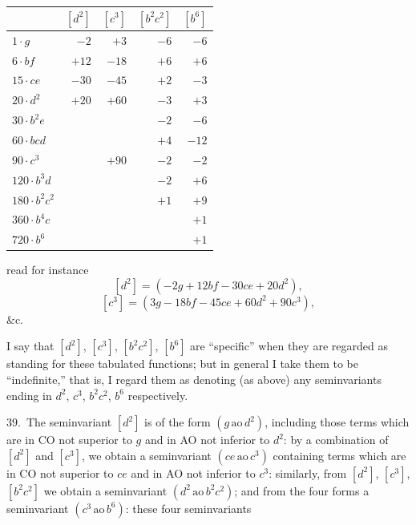 \documentclass[11pt]{article}
\begin{document}
\medskip

\begin{center}
\begin{tabular}{l|rrrr}
 & $[d^2]$ & $[c^3]$ & $[b^2 c^2]$ & $[b^6]$ \\
\hline
$1\cdot g$ & $-2$ & $+3$ & $-6$ & $-6$ \\
$6\cdot bf$ & $+12$ & $-18$ & $+6$ & $+6$ \\
$15\cdot ce$ & $-30$ & $-45$ & $+2$ & $-3$ \\
$20\cdot d^2$ & $+20$ & $+60$ & $-3$ & $+3$ \\
$30\cdot b^2 e$ & & & $-2$ & $-6$ \\
$60\cdot bcd$ & & & $+4$ & $-12$ \\
$90\cdot c^3$ & & $+90$ & $-2$ & $-2$ \\
$120\cdot b^3 d$ & & & $-2$ & $+6$ \\
$180\cdot b^2 c^2$ & & & $+1$ & $+9$ \\
$360\cdot b^4 c$ & & & & $+1$ \\
$720\cdot b^6$ & & & & $+1$ \\
\end{tabular}
\end{center}

\noindent read for instance
\[
[d^2] = (-2g + 12bf - 30ce + 20d^2),
\]
\[
[c^3] = (3g - 18bf - 45ce + 60d^2 + 90c^3),
\]
\&c.

I say that $[d^2]$, $[c^3]$, $[b^2 c^2]$, $[b^6]$ are ``specific'' when they are regarded as standing for these tabulated functions; but in general I take them to be ``indefinite,'' that is, I regard them as denoting (as above) any seminvariants ending in $d^2$, $c^3$, $b^2 c^2$, $b^6$ respectively.

39.\ The seminvariant $[d^2]$ is of the form $(g\,\mathrm{ao}\,d^2)$, including those terms which are in CO not superior to $g$ and in AO not inferior to $d^2$: by a combination of $[d^2]$ and $[c^3]$, we obtain a seminvariant $(ce\,\mathrm{ao}\,c^3)$ containing terms which are in CO not superior to $ce$ and in AO not inferior to $c^3$: similarly, from $[d^2]$, $[c^3]$, $[b^2 c^2]$ we obtain a seminvariant $(d^2\,\mathrm{ao}\,b^2 c^2)$; and from the four forms a seminvariant $(c^3\,\mathrm{ao}\,b^6)$: these four seminvariants
\end{document}
